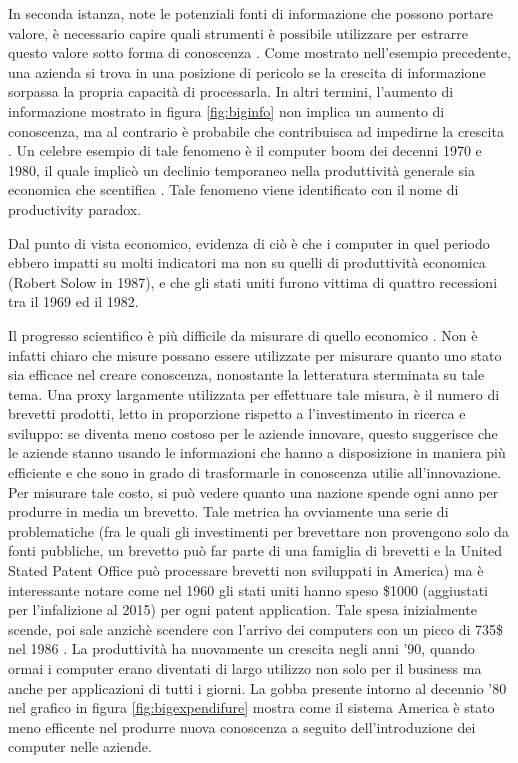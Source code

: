 \documentclass[]{book}
\begin{document}
In seconda istanza, note le potenziali fonti di informazione che possono
portare valore, è necessario capire quali strumenti è possibile
utilizzare per estrarre questo valore sotto forma di
conoscenza\citep{hand2007principles, mining2006data} . Come mostrato
nell'esempio precedente, una azienda si trova in una posizione di
pericolo se la crescita di informazione sorpassa la propria capacità di
processarla. In altri termini, l'aumento di informazione mostrato in
figura \ref{fig:biginfo} non implica un aumento di conoscenza, ma al
contrario è probabile che contribuisca ad impedirne la crescita
\citep{allen2003information, herbig1994effect}. Un celebre esempio di
tale fenomeno è il computer boom dei decenni 1970 e 1980, il quale
implicò un declinio temporaneo nella produttività generale sia economica
che scentifica \citep{solow1987we}. Tale fenomeno viene identificato con
il nome di productivity paradox.

Dal punto di vista economico, evidenza di ciò è che i computer in quel
periodo ebbero impatti su molti indicatori ma non su quelli di
produttività economica (Robert Solow in 1987), e che gli stati uniti
furono vittima di quattro recessioni tra il 1969 ed il
1982\citep{national2010us}.

Il progresso scientifico è più difficile da misurare di quello economico
\citep{hirsch2005index, hauschildt1991towards, van2000evaluation, erno2011measuring, bornmann2013societal, bornmann2014evaluate, bornmann2017does}.
Non è infatti chiaro che misure possano essere utilizzate per misurare
quanto uno stato sia efficace nel creare conoscenza, nonostante la
letteratura sterminata su tale tema. Una proxy largamente utilizzata per
effettuare tale misura, è il numero di brevetti prodotti, letto in
proporzione rispetto a l'investimento in ricerca e sviluppo: se diventa
meno costoso per le aziende innovare, questo suggerisce che le aziende
stanno usando le informazioni che hanno a disposizione in maniera più
efficiente e che sono in grado di trasformarle in conoscenza utilie
all'innovazione. Per misurare tale costo, si può vedere quanto una
nazione spende ogni anno per produrre in media un brevetto. Tale metrica
ha ovviamente una serie di problematiche (fra le quali gli investimenti
per brevettare non provengono solo da fonti pubbliche, un brevetto può
far parte di una famiglia di brevetti e la United Stated Patent Office
può processare brevetti non sviluppati in America) ma è interessante
notare come nel 1960 gli stati uniti hanno speso \$1000 (aggiustati per
l'infalizione al 2015) per ogni patent application. Tale spesa
inizialmente scende, poi sale anzichè scendere con l'arrivo dei
computers con un picco di 735\$ nel 1986 \citep{silver2012signal}. La
produttività ha nuovamente un crescita negli anni '90, quando ormai i
computer erano diventati di largo utilizzo non solo per il business ma
anche per applicazioni di tutti i giorni. La gobba presente intorno al
decennio '80 nel grafico in figura \ref{fig:bigexpendifure} mostra come
il sistema America è stato meno efficente nel produrre nuova conoscenza
a seguito dell'introduzione dei computer nelle aziende.
\end{document}
